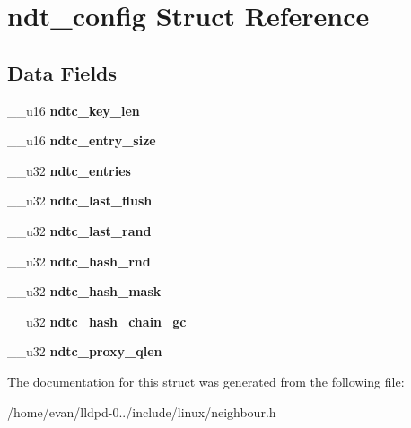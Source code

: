 \section{ndt\-\_\-config \-Struct \-Reference}
\label{structndt__config}
\subsection*{\-Data \-Fields}
\begin{DoxyCompactItemize}
\item 
\-\_\-\-\_\-u16 {\bfseries ndtc\-\_\-key\-\_\-len}\label{structndt__config_ac7ed87811a9a2eb4dbc73c5d0c80d9b3}

\item 
\-\_\-\-\_\-u16 {\bfseries ndtc\-\_\-entry\-\_\-size}\label{structndt__config_aa8b9be8fefb24fe151ebed15b9e2aead}

\item 
\-\_\-\-\_\-u32 {\bfseries ndtc\-\_\-entries}\label{structndt__config_a8449acfbac20c92359242b7994dd1071}

\item 
\-\_\-\-\_\-u32 {\bfseries ndtc\-\_\-last\-\_\-flush}\label{structndt__config_acbbb99451ec9ef534e8037fc8651eef5}

\item 
\-\_\-\-\_\-u32 {\bfseries ndtc\-\_\-last\-\_\-rand}\label{structndt__config_a76ffcacc2382242691d2674456917535}

\item 
\-\_\-\-\_\-u32 {\bfseries ndtc\-\_\-hash\-\_\-rnd}\label{structndt__config_adaabff872900a3d48386dcd339833c0b}

\item 
\-\_\-\-\_\-u32 {\bfseries ndtc\-\_\-hash\-\_\-mask}\label{structndt__config_a3d0212ce24c4d4313bcada4d64309a35}

\item 
\-\_\-\-\_\-u32 {\bfseries ndtc\-\_\-hash\-\_\-chain\-\_\-gc}\label{structndt__config_a39996045e9b50192cf9c8abe1d383842}

\item 
\-\_\-\-\_\-u32 {\bfseries ndtc\-\_\-proxy\-\_\-qlen}\label{structndt__config_a64624315c6dded1e5ed794fa1e2076d4}

\end{DoxyCompactItemize}


\-The documentation for this struct was generated from the following file\-:\begin{DoxyCompactItemize}
\item 
/home/evan/lldpd-\/0../include/linux/neighbour.\-h\end{DoxyCompactItemize}
